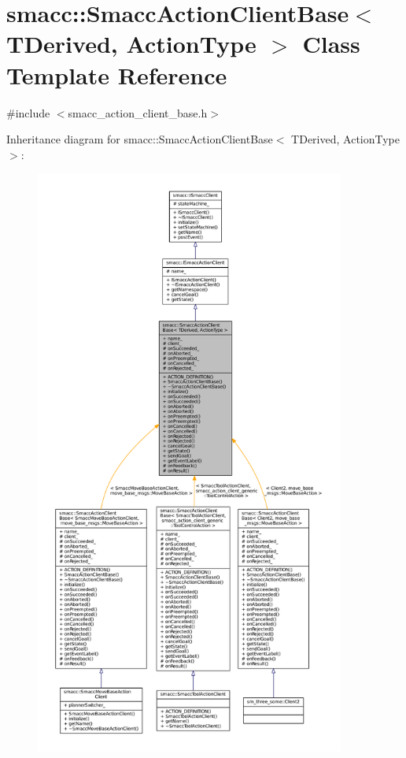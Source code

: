\hypertarget{classsmacc_1_1SmaccActionClientBase}{}\section{smacc\+:\+:Smacc\+Action\+Client\+Base$<$ T\+Derived, Action\+Type $>$ Class Template Reference}
\label{classsmacc_1_1SmaccActionClientBase}


{\ttfamily \#include $<$smacc\+\_\+action\+\_\+client\+\_\+base.\+h$>$}



Inheritance diagram for smacc\+:\+:Smacc\+Action\+Client\+Base$<$ T\+Derived, Action\+Type $>$\+:
\nopagebreak
\begin{figure}[H]
\begin{center}
\leavevmode
\includegraphics[height=550pt]{classsmacc_1_1SmaccActionClientBase__inherit__graph}
\end{center}
\end{figure}


